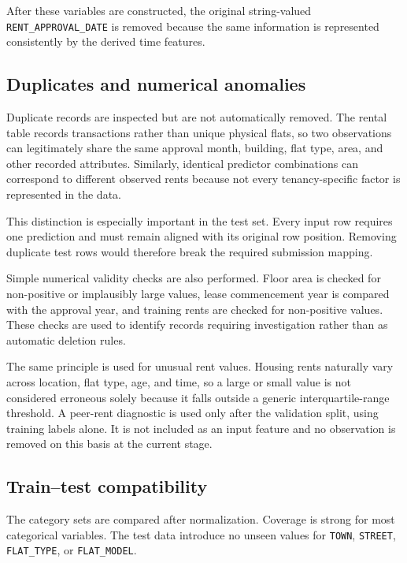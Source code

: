 \documentclass[10pt]{article}
\begin{document}
After these variables are constructed, the original string-valued \texttt{RENT\_APPROVAL\_DATE} is removed because the same information is represented consistently by the derived time features.

\subsection{Duplicates and numerical anomalies}

Duplicate records are inspected but are not automatically removed.
The rental table records transactions rather than unique physical flats, so two observations can legitimately share the same approval month, building, flat type, area, and other recorded attributes.
Similarly, identical predictor combinations can correspond to different observed rents because not every tenancy-specific factor is represented in the data.

This distinction is especially important in the test set.
Every input row requires one prediction and must remain aligned with its original row position.
Removing duplicate test rows would therefore break the required submission mapping.

Simple numerical validity checks are also performed.
Floor area is checked for non-positive or implausibly large values, lease commencement year is compared with the approval year, and training rents are checked for non-positive values.
These checks are used to identify records requiring investigation rather than as automatic deletion rules.

The same principle is used for unusual rent values.
Housing rents naturally vary across location, flat type, age, and time, so a large or small value is not considered erroneous solely because it falls outside a generic interquartile-range threshold.
A peer-rent diagnostic is used only after the validation split, using training labels alone.
It is not included as an input feature and no observation is removed on this basis at the current stage.

\subsection{Train--test compatibility}

The category sets are compared after normalization.
Coverage is strong for most categorical variables.
The test data introduce no unseen values for
\texttt{TOWN},
\texttt{STREET},
\texttt{FLAT\_TYPE},
or
\texttt{FLAT\_MODEL}.
\end{document}
